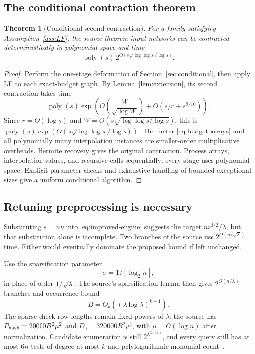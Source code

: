 \documentclass[11pt]{article}
\newtheorem{theorem}{Theorem}[section]
\theoremstyle{definition}
\theoremstyle{remark}
\newcommand{\poly}{\operatorname{poly}}
\newcommand{\ceil}[1]{\left\lceil #1\right\rceil}
\begin{document}
\subsection{The conditional contraction theorem}
\begin{theorem}[Conditional second contraction]\label{thm:conditional}
For a family satisfying Assumption~\ref{ass:LF}, the source-theorem input
networks can be contracted deterministically in polynomial space and time
\begin{equation}\label{eq:improved-engine}
 \poly(s)\,2^{O(s\sqrt{\log\log s}/\log s)}.
\end{equation}
\end{theorem}
\begin{proof}
Perform the one-stage deformation of Section~\ref{sec:conditional}, then
apply LF to each exact-budget graph. By Lemma~\ref{lem:extension}, its second
contraction takes time
\[
 \poly(s)\exp\left(O\!\left(\frac W{\sqrt{\log W}}\right)
                          +O(s/r+s^{9/10})\right).
\]
Since $r=\Theta(\log s)$ and
$W=O(s\sqrt{\log\log s/\log s})$, this is
$\poly(s)\exp(O(s\sqrt{\log\log s}/\log s))$.
The factor \eqref{eq:budget-arrays} and all polynomially many interpolation
instances are smaller-order multiplicative overheads. Hermite recovery gives
the original contraction. Process arrays, interpolation values, and recursive
calls sequentially; every stage uses polynomial space. Explicit parameter
checks and exhaustive handling of bounded exceptional sizes give a uniform
conditional algorithm.
\end{proof}

\subsection{Retuning preprocessing is necessary}
Substituting $s=n\nu$ into \eqref{eq:improved-engine} suggests the target
$n\nu^{3/2}/\lambda$, but that substitution alone is incomplete. Two
branches of the source use $2^{O(n/\sqrt\lambda)}$ time. Either would
eventually dominate the proposed bound if left unchanged.

Use the sparsification parameter
\[
 \sigma=1/\ceil{\log_2n},
\]
in place of order $1/\sqrt\lambda$. The source's sparsification lemma
then gives $2^{O(n/\lambda)}$ branches and occurrence bound
\[
 B=O_k((\lambda\log\lambda)^{k-1}).
\]
The sparse-check row lengths remain fixed powers of $\lambda$: the source
has $P_{\rm hash}=20000B^2\mu^2$ and $D_0=320000B^2\mu^3$, with
$\mu=O(\log n)$ after normalization. Candidate enumeration is still
$2^{\lambda^{O_k(1)}}$, and every query still has at most $6n$ tests of
degree at most $k$ and polylogarithmic monomial count~\cite{source}.
\end{document}
